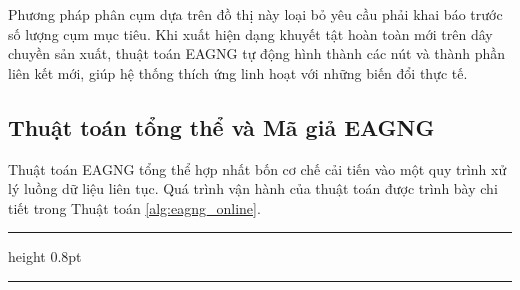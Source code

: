 Phương pháp phân cụm dựa trên đồ thị này loại bỏ yêu cầu phải khai báo trước số lượng cụm mục tiêu. Khi xuất hiện dạng khuyết tật hoàn toàn mới trên dây chuyền sản xuất, thuật toán EAGNG tự động hình thành các nút và thành phần liên kết mới, giúp hệ thống thích ứng linh hoạt với những biến đổi thực tế.

\subsection{Thuật toán tổng thể và Mã giả EAGNG}
\label{subsec:magia_eagng}

Thuật toán EAGNG tổng thể hợp nhất bốn cơ chế cải tiến vào một quy trình xử lý luồng dữ liệu liên tục. Quá trình vận hành của thuật toán được trình bày chi tiết trong Thuật toán \ref{alg:eagng_online}.

\bigskip
\noindent\hrule height 0.8pt
\vspace{2pt}
\captionsetup{justification=raggedright, singlelinecheck=false}
\label{alg:eagng_online}
\vspace{-6pt}
\noindent\hrule
\vspace{4pt}

